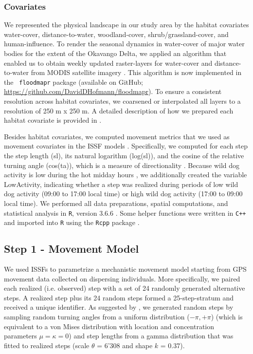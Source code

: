 \documentclass[abstract=on,10pt,a4paper,bibliography=totocnumbered]{article}
\begin{document}
\subsubsection{Covariates}
We represented the physical landscape in our study area by the habitat
covariates \textsf{water-cover, distance-to-water, woodland-cover,
shrub/grassland-cover, and human-influence}. To render the seasonal dynamics in
water-cover of major water bodies for the extent of the Okavango Delta, we
applied an algorithm that enabled us to obtain weekly updated raster-layers for
\textsf{water-cover} and \textsf{distance-to-water} from MODIS satellite imagery
\citep{Wolski.2017, Hofmann.2021}. This algorithm is now implemented in the {\tt
floodmapr} package (available on GitHub;
\url{https://github.com/DavidDHofmann/floodmapr}). To ensure a consistent
resolution across habitat covariates, we coarsened or interpolated all layers to
a resolution of 250 m x 250 m. A detailed description of how we prepared each
habitat covariate is provided in \cite{Hofmann.2021}.

Besides habitat covariates, we computed movement metrics that we used as
movement covariates in the ISSF models \citep{Avgar.2016, Fieberg.2021}.
Specifically, we computed for each step the step length (\textsf{sl}), its
natural logarithm (\textsf{log(sl)}), and the cosine of the relative turning
angle (\textsf{cos(ta)}), which is a measure of directionality
\citep{Turchin.1998}. Because wild dog activity is low during the hot midday
hours \citep{Cozzi.2012}, we additionally created the variable
\textsf{LowActivity}, indicating whether a step was realized during periods of
low wild dog activity (09:00 to 17:00 local time) or high wild dog activity
(17:00 to 09:00 local time). We performed all data preparations, spatial
computations, and statistical analysis in {\tt R}, version 3.6.6 \citep{R.2020}.
Some helper functions were written in {\tt C++} and imported into {\tt R} using
the {\tt Rcpp} package \citep{Eddelbuettel.2011, Eddelbuettel.2013}.

\subsection{Step 1 - Movement Model}
We used ISSFs \citep{Avgar.2016} to parametrize a mechanistic movement model
starting from GPS movement data collected on dispersing individuals. More
specifically, we paired each realized (i.e. observed) step with a set of 24
randomly generated alternative steps. A realized step plus its 24 random steps
formed a 25-step-stratum and received a unique identifier. As suggested by
\cite{Avgar.2016}, we generated random steps by sampling random turning angles
from a uniform distribution (\(-\pi, +\pi\)) (which is equivalent to a von Mises
distribution with location and concentration parameters \(\mu = \kappa = 0\))
and step lengths from a gamma distribution that was fitted to realized steps
(scale \(\theta\) = 6'308 and shape \(k\) = 0.37).
\end{document}
